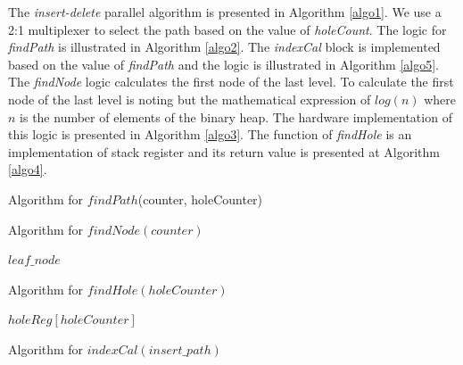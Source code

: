 \documentclass[10pt, conference, compsocconf]{IEEEtran}
\begin{document}
The {\it insert-delete} parallel algorithm is presented in Algorithm \ref{algo1}.
We use a 2:1 multiplexer to select the path based on the value of {\it holeCount}.
The logic for {\it findPath} is illustrated in Algorithm \ref{algo2}.
The {\it indexCal} block is implemented based on the value of {\it findPath} and the logic is illustrated in Algorithm \ref{algo5}.
The {\it findNode} logic calculates the first node of the last level.
To calculate the first node of the last level is noting but the mathematical expression of $log(n)$ where $n$ is the number of elements of the binary heap.
The hardware implementation of this logic is presented in Algorithm \ref{algo3}.
The function of {\it findHole} is an implementation of stack register and its return value is presented at Algorithm \ref{algo4}.

\begin{algorithm}
\caption{Algorithm for $findPath$(counter, holeCounter)}
\label{algo2}
\begin{algorithmic}[1]
    \ELSE
    \ENDIF
\end{algorithmic}
\end{algorithm}

\begin{algorithm}
\caption{Algorithm for $findNode(counter)$}
\label{algo3}
\begin{algorithmic}[1]
    \ENDFOR
    \RETURN $leaf\_node$
\end{algorithmic}
\end{algorithm}


\begin{algorithm}
\caption{Algorithm for $findHole(holeCounter)$}
\label{algo4}
\begin{algorithmic}[1]
    \RETURN $holeReg[holeCounter]$
\end{algorithmic}
\end{algorithm}

\begin{algorithm}
\caption{Algorithm for $indexCal(insert\_path)$}
\label{algo5}
\begin{algorithmic}[1]
        \ELSE
        \ENDIF
    \ENDFOR
\end{algorithmic}
\end{algorithm}
\end{document}

